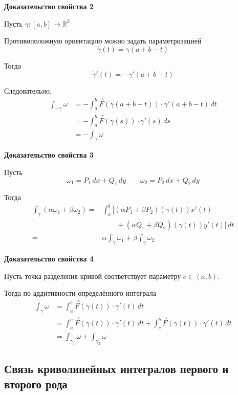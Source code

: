 \documentclass[12pt,a4paper]{article}
\begin{document}
\textbf{Доказательство свойства 2}

\begin{proofbox}
Пусть $\gamma\colon[a,b]\to\mathbb{R}^2$

Противоположную ориентацию можно задать параметризацией
\[
\widetilde{\gamma}(t)=\gamma(a+b-t)
\]

Тогда
\[
\widetilde{\gamma}'(t)
=
-\gamma'(a+b-t)
\]

Следовательно,
\[
\begin{aligned}
\int_{-\gamma}\omega
&=
-\int_a^b
\vec{F}(\gamma(a+b-t))
\cdot\gamma'(a+b-t)\,dt
\\
&=
-\int_a^b
\vec{F}(\gamma(s))\cdot\gamma'(s)\,ds
\\
&=
-\int_\gamma\omega
\end{aligned}
\]
\end{proofbox}

\textbf{Доказательство свойства 3}

\begin{proofbox}
Пусть
\[
\omega_1=P_1\,dx+Q_1\,dy
\qquad
\omega_2=P_2\,dx+Q_2\,dy
\]

Тогда
\[
\begin{aligned}
\int_\gamma(\alpha\omega_1+\beta\omega_2)
={}&
\int_a^b
\bigl[
(\alpha P_1+\beta P_2)(\gamma(t))x'(t)
\\
&\qquad+
(\alpha Q_1+\beta Q_2)(\gamma(t))y'(t)
\bigr]\,dt
\\
={}&
\alpha\int_\gamma\omega_1
+
\beta\int_\gamma\omega_2
\end{aligned}
\]
\end{proofbox}

\textbf{Доказательство свойства 4}

\begin{proofbox}
Пусть точка разделения кривой соответствует параметру $c\in(a,b)$.

Тогда по аддитивности определённого интеграла
\[
\begin{aligned}
\int_\gamma\omega
&=
\int_a^b
\vec{F}(\gamma(t))\cdot\gamma'(t)\,dt
\\
&=
\int_a^c
\vec{F}(\gamma(t))\cdot\gamma'(t)\,dt
+
\int_c^b
\vec{F}(\gamma(t))\cdot\gamma'(t)\,dt
\\
&=
\int_{\gamma_1}\omega
+
\int_{\gamma_2}\omega
\end{aligned}
\]
\end{proofbox}

\subsection{Связь криволинейных интегралов первого и второго рода}
\end{document}
